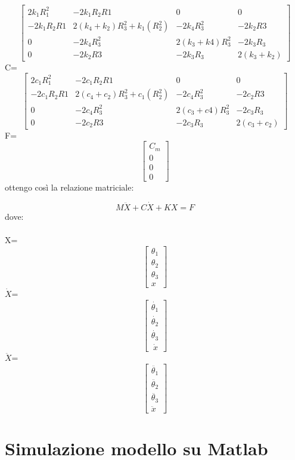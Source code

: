 \documentclass{article}
\begin{document}
$$
\begin{bmatrix}
2k_1R_{1}^2 & -2k_{1}R_{2}R{1} & 0 & 0\\
-2k_{1}R_{2}R{1} & 2(k_4 + k_2)R_{3}^2 + k_1(R_{2}^2) & -2k_{4}R_{3}^2 & -2k_{2}R{3}\\
0 & -2k_{4}R_{3}^2 & 2(k_{3}+k{4})R_{3}^2  & -2k_{3}R_3\\
0 & -2k_{2}R{3} &  -2k_{3}R_3\ & 2(k_3+k_2)
\end{bmatrix}
$$
C= 
$$
\begin{bmatrix}
2c_1R_{1}^2 & -2c_{1}R_{2}R{1} & 0 & 0\\
-2c_{1}R_{2}R{1} & 2(c_4 + c_2)R_{3}^2 + c_1(R_{2}^2) & -2c_{4}R_{3}^2 & -2c_{2}R{3}\\
0 & -2c_{4}R_{3}^2 & 2(c_{3}+c{4})R_{3}^2  & -2c_{3}R_3\\
0 & -2c_{2}R{3} &  -2c_{3}R_3\ & 2(c_3+c_2)
\end{bmatrix}
$$
F= 
$$
\begin{bmatrix}
C_m \\
0 \\
0\\
0
\end{bmatrix}
$$
ottengo così la relazione matriciale:


$$ M\ddot{X} + C\dot{X} + KX = F $$
dove:
\\
\\
X= 
$$
\begin{bmatrix}

\theta_1 \\
\theta_2\\
\theta_3\\
x 
\end{bmatrix}
$$
$\dot{X}$= 
$$
\begin{bmatrix}
\dot{\theta_1} \\
\dot{\theta_2}\\
\dot{\theta_3}\\\
\dot{x} 
\end{bmatrix}
$$
$\ddot{X}$= 
$$
\begin{bmatrix}
\ddot{\theta_1} \\
\ddot{\theta_2}\\
\ddot{\theta_3}\\
\ddot{x} 
\end{bmatrix}
$$


\section{Simulazione modello su Matlab}
\end{document}
